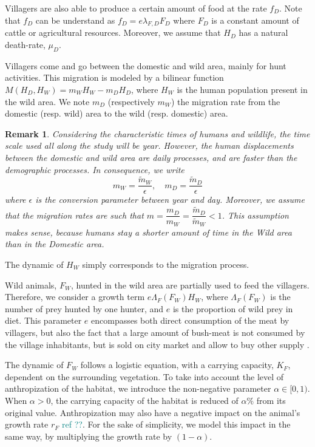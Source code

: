 \documentclass{article}
\newcommand{\lfd}{\lambda_{F, D}}
\newcommand{\mW}{\tilde{m}_W}
\newcommand{\mD}{\tilde{m}_D}
\newcommand{\marc}[1]{\textcolor{teal}{#1}}
\newtheorem{remark}{Remark}
\begin{document}
Villagers are also able to produce a certain amount of food at the rate $f_D$. Note that $f_D$ can be understand as $f_D = e \lfd F_D$ where $F_D$ is a constant amount of cattle or agricultural resources. 
Moreover, we assume that $H_D$ has a natural death-rate, $\mu_D$.

Villagers come and go between the domestic and wild area, mainly for hunt activities. This migration is modeled by a bilinear function $M(H_D, H_W) = m_W H_W - m_D H_D$, where $H_W$ is the human population present in the wild area. We note $m_D$ (respectively $m_W$) the migration rate from the domestic (resp. wild) area to the wild (resp. domestic) area.

\begin{remark} \label{remark:slow-fast}
Considering the characteristic times of humans and wildlife, the time scale used all along the study will be year. However, the human displacements between the domestic and wild area are daily processes, and are faster than the demographic processes. In consequence, we write $$m_W = \dfrac{\mW}{\epsilon}, \quad m_D = \dfrac{\mD}{\epsilon}$$ where $\epsilon$ is the conversion parameter between year and day. 
Moreover, we assume that the migration rates are such that $m = \dfrac{m_D}{m_W} = \dfrac{\mD}{\mW} < 1$. This assumption makes sense, because humans stay a shorter amount of time in the Wild area than in the Domestic area.
\end{remark}

The dynamic of $H_W$ simply corresponds to the migration process. 

Wild animals, $F_W$, hunted in the wild area are partially used to feed the villagers. Therefore, we consider a growth term $e \Lambda_F(F_W) H_W$, where $\Lambda_F(F_W)$ is the number of prey hunted by one hunter, and $e$ is the proportion of wild prey in diet. This parameter $e$ encompasses both direct consumption of the meat by villagers, but also the fact that a large amount of bush-meat is not consumed by the village inhabitants, but is sold on city market and allow to buy other supply \cite{wilkie_bushmeat_1998}.


The dynamic of $F_W$ follows a logistic equation, with a carrying capacity, $K_F$, dependent on the surrounding vegetation. To take into account the level of anthropization of the habitat, we introduce the non-negative parameter $\alpha \in [0, 1)$. When $\alpha > 0$, the carrying capacity of the habitat is reduced of $\alpha \%$ from its original value. Anthropization may also have a negative impact on the animal's growth rate $r_F$ \marc{ref ??}. For the sake of simplicity, we model this impact in the same way, by multiplying the growth rate by $(1-\alpha)$.
\end{document}
